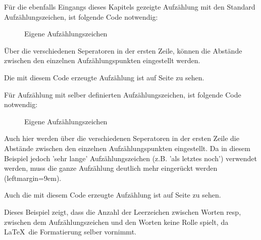 
Für die ebenfalls Eingangs dieses Kapitels gezeigte Aufzählung mit den Standard Auf\-zählungs\-zeichen, ist folgende Code notwendig:

\begin{figure}[h!]
    \centering
      \caption{Eigene Aufzählungszeichen}
\end{figure} 

Über die verschiedenen Seperatoren in der ersten Zeile, können die Abstände zwischen den einzelnen Aufzählungspunkten eingestellt werden. 


Die mit diesem Code erzeugte Aufzählung ist auf Seite \pageref{TextFormatieren} zu sehen.

\newpage Für Aufzählung mit selber definierten Aufzählungszeichen, ist folgende Code notwendig:

\begin{figure}[h!]
    \centering
      \caption{Eigene Aufzählungszeichen}
\end{figure} 

Auch hier werden über die verschiedenen Seperatoren in der ersten Zeile die Abstände zwischen den einzelnen Aufzählungspunkten eingestellt. Da in diesem Beispiel jedoch 'sehr lange' Aufzählungszeichen (z.B. 'als letztes noch') verwendet werden, muss die ganze Aufzählung deutlich mehr eingerückt werden (leftmargin=9em).  
 
Auch die mit diesem Code erzeugte Aufzählung ist auf Seite \pageref{TextFormatieren} zu sehen.

Dieses Beispiel zeigt, dass die Anzahl der Leerzeichen zwischen Worten resp, zwischen dem Aufzählungszeichen und den Worten keine Rolle spielt, da \LaTeX\ die Formatierung selber vornimmt.
